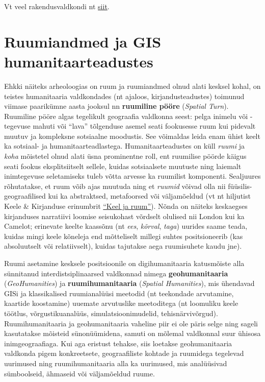 \documentclass[
]{book}
\begin{document}
Vt veel rakendusvaldkondi nt \href{https://grindgis.com/blog/gis-applications-uses}{siit}.

\hypertarget{ruumiandmed-ja-gis-humanitaarteadustes}{%
\section{Ruumiandmed ja GIS humanitaarteadustes}\label{ruumiandmed-ja-gis-humanitaarteadustes}}

Ehkki näiteks arheoloogias on ruum ja ruumiandmed olnud alati kesksel kohal, on teistes humanitaaria valdkondades (nt ajaloos, kirjandusteadustes) toimunud viimase paarikümne aasta jooksul nn \textbf{ruumiline pööre} (\emph{Spatial Turn}). Ruumiline pööre algas tegelikult geograafia valdkonna seest: pelga inimelu või -tegevuse mahuti või ``lava'' tõlgenduse asemel seati fookusesse ruum kui pidevalt muutuv ja kompleksne sotsiaalne moodustis. See võimaldas leida enam ühist keelt ka sotsiaal- ja humanitaarteadlastega. Humanitaarteadustes on küll \emph{ruumi} ja \emph{koha} mõistetel olnud alati üsna prominentne roll, ent ruumilise pöörde käigus seati fookus eksplitsiitselt sellele, kuidas sotsiaalsete muutuste ning laiemalt inimtegevuse seletamiseks tuleb võtta arvesse ka ruumilist komponenti. Sealjuures rõhutatakse, et ruum võib ajas muutuda ning et \emph{ruumid} võivad olla nii füüsilis-geograafilised kui ka abstraktsed, metafoorsed või väljamõeldud (vt nt hiljutist Keele \& Kirjanduse erinumbrit \href{https://keeljakirjandus.ee/ee/issue/2020-8-9/}{``Keel ja ruum''}). Nõnda on näiteks keskaegses kirjanduses narratiivi loomise seisukohast võrdselt olulised nii London kui ka Camelot; erinevate keelte kaassõnu (nt \emph{ees}, \emph{kõrval}, \emph{taga}) uurides saame teada, kuidas mingi keele kõneleja end mõtteliselt millegi suhtes positsioneerib (kas absoluutselt või relatiivselt), kuidas tajutakse aega ruumisuhete kaudu jne).

Ruumi asetamine kesksele positsioonile on digihumanitaaria katusmõiste alla sünnitanud interdistsiplinaarsed valdkonnad nimega \textbf{geohumanitaaria} (\emph{GeoHumanities}) ja \textbf{ruumihumanitaaria} (\emph{Spatial Humanities}), mis ühendavad GISi ja klassikalised ruumianalüüsi meetodid (nt teekondade arvutamine, kaartide koostamine) uuemate arvutuslike meetoditega (nt loomuliku keele töötlus, võrgustikuanalüüs, simulatsioonimudelid, tehisnärvivõrgud). Ruumihumanitaaria ja geohumanitaaria vaheline piir ei ole päris selge ning sageli kasutatakse mõisteid sünonüümidena, samuti on mõlemal valdkonnal suur ühisosa inimgeograafiaga. Kui aga eristust tehakse, siis loetakse geohumanitaaria valdkonda pigem konkreetsete, geograafiliste kohtade ja ruumidega tegelevad uurimused ning ruumihumanitaaria alla ka uurimused, mis analüüsivad sümboolseid, ähmaseid või väljamõeldud ruume.
\end{document}
